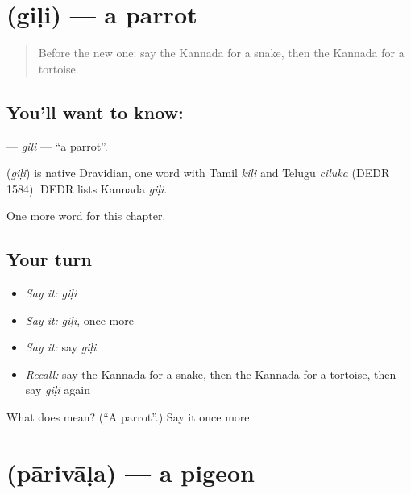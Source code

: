 \section[\texorpdfstring{\kn{ಗಿಳಿ} (giḷi)}{ಗಿಳಿ (giḷi)}]{ (giḷi) — a parrot}

\label{lesson:KA-C131-gili}



\begin{quote}
Before the new one: say the Kannada for a snake, then the Kannada for a tortoise.
\end{quote}

\subsection*{You'll want to know: }
\textbf{} — \emph{giḷi} — \textquotedblleft{}a parrot\textquotedblright{}.

\begin{cousinweb}
\textbf{} (\emph{giḷi}) is native Dravidian, one word with Tamil \emph{kiḷi} and Telugu \emph{ciluka} (DEDR 1584). DEDR lists Kannada \emph{giḷi}.
\end{cousinweb}

\begin{grammarlens}[title={What you've built}]
One more word for this chapter.
\end{grammarlens}

\subsection*{Your turn}
\begin{itemize}
\raggedright
  \item \emph{Say it:} \emph{giḷi}
  \item \emph{Say it:} \emph{giḷi}, once more
  \item \emph{Say it:} say \emph{giḷi}
  \item \emph{Recall:} say the Kannada for a snake, then the Kannada for a tortoise, then say \emph{giḷi} again
\end{itemize}

\begin{tcolorbox}[breakable,colback=teal!4,colframe=teal!35!black,title={Before you move on}]
What does  mean? (\textquotedblleft{}A parrot\textquotedblright{}.) Say it once more.
\end{tcolorbox}
\section[\texorpdfstring{\kn{ಪಾರಿವಾಳ} (pārivāḷa)}{ಪಾರಿವಾಳ (pārivāḷa)}]{ (pārivāḷa) — a pigeon}

